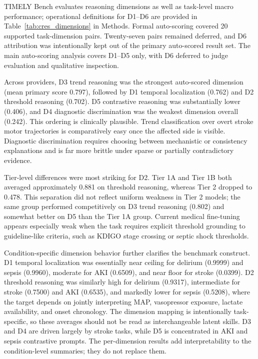 \documentclass[pdflatex,sn-nature]{sn-jnl}
\begin{document}
TIMELY Bench evaluates reasoning dimensions as well as task-level macro performance; operational definitions for D1--D6 are provided in Table~\ref{tab:cres_dimensions} in Methods. Formal auto-scoring covered 20 supported task-dimension pairs. Twenty-seven pairs remained deferred, and D6 attribution was intentionally kept out of the primary auto-scored result set. The main auto-scoring analysis covers D1--D5 only, with D6 deferred to judge evaluation and qualitative inspection.

Across providers, D3 trend reasoning was the strongest auto-scored dimension (mean primary score 0.797), followed by D1 temporal localization (0.762) and D2 threshold reasoning (0.702). D5 contrastive reasoning was substantially lower (0.406), and D4 diagnostic discrimination was the weakest dimension overall (0.242). This ordering is clinically plausible. Trend classification over overt stroke motor trajectories is comparatively easy once the affected side is visible. Diagnostic discrimination requires choosing between mechanistic or consistency explanations and is far more brittle under sparse or partially contradictory evidence.

Tier-level differences were most striking for D2. Tier 1A and Tier 1B both averaged approximately 0.881 on threshold reasoning, whereas Tier 2 dropped to 0.478. This separation did not reflect uniform weakness in Tier 2 models; the same group performed competitively on D3 trend reasoning (0.802) and somewhat better on D5 than the Tier 1A group. Current medical fine-tuning appears especially weak when the task requires explicit threshold grounding to guideline-like criteria, such as KDIGO stage crossing or septic shock thresholds.

Condition-specific dimension behavior further clarifies the benchmark construct. D1 temporal localization was essentially near ceiling for delirium (0.9999) and sepsis (0.9960), moderate for AKI (0.6509), and near floor for stroke (0.0399). D2 threshold reasoning was similarly high for delirium (0.9317), intermediate for stroke (0.7500) and AKI (0.6535), and markedly lower for sepsis (0.5208), where the target depends on jointly interpreting MAP, vasopressor exposure, lactate availability, and onset chronology. The dimension mapping is intentionally task-specific, so these averages should not be read as interchangeable latent skills. D3 and D4 are driven largely by stroke tasks, while D5 is concentrated in AKI and sepsis contrastive prompts. The per-dimension results add interpretability to the condition-level summaries; they do not replace them.
\end{document}
